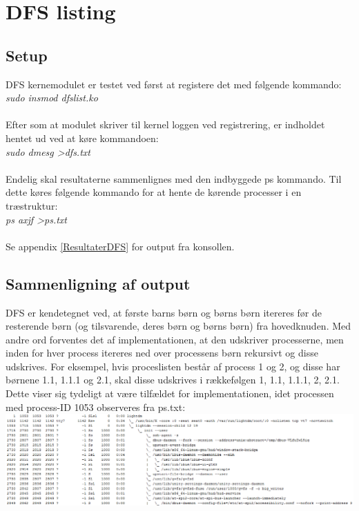 \section{DFS listing}
\subsection{Setup}
DFS kernemodulet er testet ved først at registere det med følgende kommando:\\
\textit{sudo insmod dfslist.ko}
\\
\\
Efter som at modulet skriver til kernel loggen ved registrering, er indholdet hentet ud ved at køre kommandoen:\\
\textit{sudo dmesg \textgreater dfs.txt}
\\
\\
Endelig skal resultaterne sammenlignes med den indbyggede ps kommando. Til dette køres følgende kommando for at hente de kørende processer i en træstruktur:\\
\textit{ps axjf \textgreater ps.txt}
\\
\\
Se appendix \ref{ResultaterDFS} for output fra konsollen.

\subsection{Sammenligning af output}
DFS er kendetegnet ved, at første barns børn og børns børn itereres før de resterende børn (og tilsvarende, deres børn og børns børn) fra hovedknuden. Med andre ord forventes det af implementationen, at den udskriver processerne, men inden for hver process itereres ned over processens børn rekursivt og disse udskrives. For eksempel, hvis proceslisten består af process 1 og 2, og disse har børnene 1.1, 1.1.1 og 2.1, skal disse udskrives i rækkefølgen 1, 1.1, 1.1.1, 2, 2.1.\\

Dette viser sig tydeligt at være tilfældet for implementationen, idet processen med process-ID 1053 observeres fra ps.txt:\\
\includegraphics[width=\textwidth]{Testing/DFS1.png}

